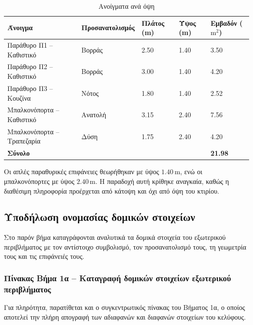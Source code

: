 \documentclass[12pt,a4paper]{article}
\begin{document}
\begin{table}[H]
\centering
\small
\caption{Ανοίγματα ανά όψη}
\begin{tabularx}{\textwidth}{L C{2.7cm} C{2.2cm} C{2.2cm} C{2.4cm}}
\toprule
\textbf{Άνοιγμα} & \textbf{Προσανατολισμός} & \textbf{Πλάτος (m)} & \textbf{Ύψος (m)} & \textbf{Εμβαδόν (\(\mathrm{m^2}\))} \\
\midrule
Παράθυρο Π1 -- Καθιστικό & Βορράς & 2.50 & 1.40 & 3.50 \\
Παράθυρο Π2 -- Καθιστικό & Βορράς & 3.00 & 1.40 & 4.20 \\
Παράθυρο Π3 -- Κουζίνα & Νότος & 1.80 & 1.40 & 2.52 \\
Μπαλκονόπορτα -- Καθιστικό & Ανατολή & 3.15 & 2.40 & 7.56 \\
Μπαλκονόπορτα -- Τραπεζαρία & Δύση & 1.75 & 2.40 & 4.20 \\
\midrule
\textbf{Σύνολο} &  &  &  & \textbf{21.98} \\
\bottomrule
\end{tabularx}
\end{table}

Οι απλές παραθυρικές επιφάνειες θεωρήθηκαν με ύψος \(1.40\,\mathrm{m}\), ενώ οι
μπαλκονόπορτες με ύψος \(2.40\,\mathrm{m}\). Η παραδοχή αυτή κρίθηκε αναγκαία, καθώς η
διαθέσιμη πληροφορία προέρχεται από κάτοψη και όχι από όψη του κτιρίου.

\subsection{Υποδήλωση ονομασίας δομικών στοιχείων}

Στο παρόν βήμα καταγράφονται αναλυτικά τα δομικά στοιχεία του εξωτερικού περιβλήματος
με τον αντίστοιχο συμβολισμό, τον προσανατολισμό τους, τη γεωμετρία τους και τις
επιφάνειές τους.

\subsubsection{Πίνακας Βήμα 1α -- Καταγραφή δομικών στοιχείων εξωτερικού περιβλήματος}

Για πληρότητα, παρατίθεται και ο συγκεντρωτικός πίνακας του Βήματος 1α, ο οποίος
αποτελεί την πλήρη απογραφή των αδιαφανών και διαφανών στοιχείων του κελύφους.
\end{document}
